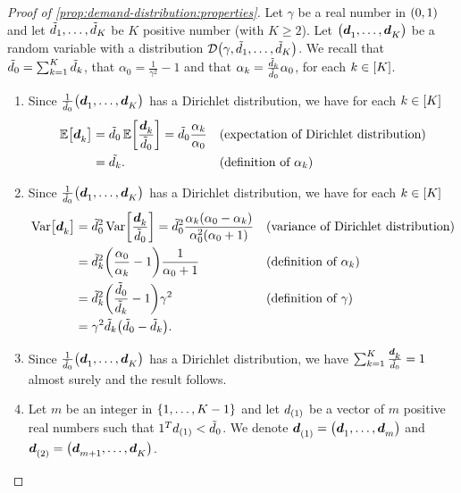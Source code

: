 \begin{proof}[Proof of \cref{prop:demand-distribution:properties}] 
Let $\gamma$ be a real number in $\bracket{0,1}$ and let $\tilde{d}_1,\ldots,\tilde{d}_K$ be $K$ positive number (with $K\ge2$).
Let $\bracket{\va\demand_1,\ldots,\va\demand_K}$ be a random variable with a \distrib distribution $\cD\bracket{\gamma,\tilde{\demand}_1,\ldots,\tilde{\demand}_K}$.
We recall that $\tilde{d}_0=\sum_{k=1}^K\tilde{d}_k$, that $\alpha_0=\frac{1}{\gamma^2}-1$ and that $\alpha_k=\frac{\tilde{d}_k}{\tilde{d}_0}\alpha_0$, for each $k\in\range{K}$.
\begin{enumerate}
\item Since $\frac{1}{\tilde{\demand}_0}\bracket{\va\demand_1,\ldots,\va\demand_K}$ has a Dirichlet distribution, we have for each $k\in\range{K}$
\begin{subequations}
\begin{align}
  \espe\sqbracket{\va\demand_k}
  &= \tilde{\demand}_0\espe\sqbracket{\frac{\va\demand_k}{\tilde{\demand}_0}}
  = \tilde{\demand}_0
  \frac{\alpha_k}{\alpha_0}
  && \mbox{(expectation of Dirichlet distribution)}
  \\
  &= \tilde{\demand_k}.
  && \mbox{(definition of $\alpha_k$)}
\end{align}
\end{subequations}
\item Since $\frac{1}{\tilde{\demand}_0}\bracket{\va\demand_1,\ldots,\va\demand_K}$ has a Dirichlet distribution, we have for each $k\in\range{K}$
\begin{subequations}
\begin{align}
  \vari\sqbracket{\va\demand_k}
  &= \tilde{\demand}_0^2\vari\sqbracket{\frac{\va\demand_k}{\tilde{\demand}_0}}
  = \tilde{\demand}_0^2
  \frac{\alpha_k\bracket{\alpha_0-\alpha_k}}{\alpha_0^2\bracket{\alpha_0+1}}
  && \mbox{(variance of Dirichlet distribution)}
  \\
  &= \tilde{\demand}_k^2 \bracket{\frac{\alpha_0}{\alpha_k}-1}\frac{1}{\alpha_0+1}
  && \mbox{(definition of $\alpha_k$)}
  \\
  &= \tilde{\demand}_k^2 \bracket{\frac{\tilde{\demand}_0}{\tilde{\demand}_k}-1}\gamma^2
  && \mbox{(definition of $\gamma$)}
  \\
  &= \gamma^2 \tilde{\demand}_k \bracket{\tilde{\demand}_0-\tilde{\demand}_k}.
\end{align}
\end{subequations}
\item Since $\frac{1}{\tilde{\demand}_0}\bracket{\va\demand_1,\ldots,\va\demand_K}$ has a Dirichlet distribution, we have $\sum_{k=1}^K \frac{\va\demand_k}{\tilde{\demand}_0}=1$ almost surely and the result follows.
\item Let $m$ be an integer in $\range[1]{K-1}$ and let $d_{(1)}$ be a vector of $m$ positive real numbers such that $1^T d_{(1)}<\tilde{d}_0$.
We denote $\va\demand_{(1)}=\bracket{\va\demand_1,\ldots,\va\demand_m}$ and $\va\demand_{(2)}=\bracket{\va\demand_{m+1},\ldots,\va\demand_K}$.


\end{enumerate}
\end{proof}
